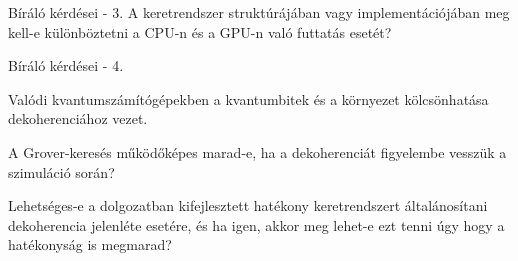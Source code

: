 \documentclass[aspectratio=169]{beamer}
\begin{document}
\begin{frame}{Bíráló kérdései - 3.}
A keretrendszer struktúrájában vagy implementációjában meg kell-e különböztetni a CPU-n és a GPU-n való futtatás esetét?
\end{frame}

\begin{frame}{Bíráló kérdései - 4.}

Valódi kvantumszámítógépekben a kvantumbitek és a környezet kölcsönhatása dekoherenciához vezet.

A Grover-keresés működőképes marad-e, ha a dekoherenciát figyelembe vesszük a szimuláció során?

Lehetséges-e a dolgozatban kifejlesztett hatékony keretrendszert általánosítani dekoherencia jelenléte esetére, és ha igen, akkor meg lehet-e ezt tenni úgy hogy a hatékonyság is megmarad?

\end{frame}
\end{document}
